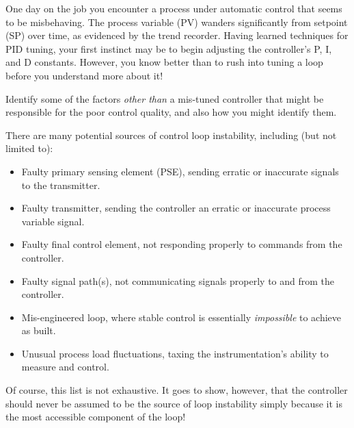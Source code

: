 

One day on the job you encounter a process under automatic control that seems to be misbehaving.  The process variable (PV) wanders significantly from setpoint (SP) over time, as evidenced by the trend recorder.  Having learned techniques for PID tuning, your first instinct may be to begin adjusting the controller's P, I, and D constants.  However, you know better than to rush into tuning a loop before you understand more about it!

\vskip 10pt

Identify some of the factors {\it other than} a mis-tuned controller that might be responsible for the poor control quality, and also how you might identify them.







There are many potential sources of control loop instability, including (but not limited to):

\begin{itemize}
\item{}Faulty primary sensing element (PSE), sending erratic or inaccurate signals to the transmitter.
\item{}Faulty transmitter, sending the controller an erratic or inaccurate process variable signal.
\item{}Faulty final control element, not responding properly to commands from the controller.
\item{}Faulty signal path(s), not communicating signals properly to and from the controller.
\item{}Mis-engineered loop, where stable control is essentially {\it impossible} to achieve as built.
\item{}Unusual process load fluctuations, taxing the instrumentation's ability to measure and control.
\end{itemize} 







Of course, this list is not exhaustive.  It goes to show, however, that the controller should never be assumed to be the source of loop instability simply because it is the most accessible component of the loop!




